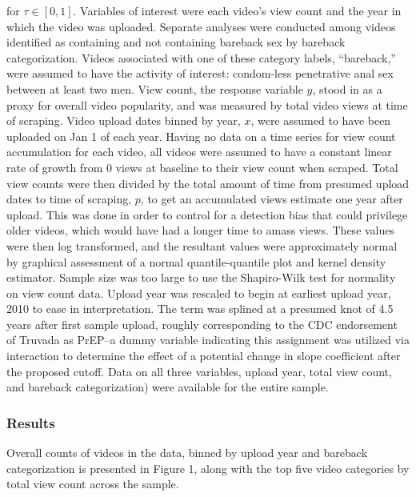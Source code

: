 \documentclass[]{article}
\begin{document}
for \(\tau \in \left [0,1 \right ]\). Variables of interest were each
video's view count and the year in which the video was uploaded.
Separate analyses were conducted among videos identified as containing
and not containing bareback sex by bareback categorization. Videos
associated with one of these category labels, ``bareback,'' were assumed
to have the activity of interest: condom-less penetrative anal sex
between at least two men. View count, the response variable \(y\), stood
in as a proxy for overall video popularity, and was measured by total
video views at time of scraping. Video upload dates binned by year,
\(x\), were assumed to have been uploaded on Jan 1 of each year. Having
no data on a time series for view count accumulation for each video, all
videos were assumed to have a constant linear rate of growth from 0
views at baseline to their view count when scraped. Total view counts
were then divided by the total amount of time from presumed upload dates
to time of scraping, \(p\), to get an accumulated views estimate one
year after upload. This was done in order to control for a detection
bias that could privilege older videos, which would have had a longer
time to amass views. These values were then log transformed, and the
resultant values were approximately normal by graphical assessment of a
normal quantile-quantile plot and kernel density estimator. Sample size
was too large to use the Shapiro-Wilk test for normality on view count
data. Upload year was rescaled to begin at earliest upload year, 2010 to
ease in interpretation. The term was splined at a presumed knot of 4.5
years after first sample upload, roughly corresponding to the CDC
endorsement of Truvada as PrEP--a dummy variable indicating this
assignment was utilized via interaction to determine the effect of a
potential change in slope coefficient after the proposed cutoff. Data on
all three variables, upload year, total view count, and bareback
categorization) were available for the entire sample.

\subsubsection{Results}\label{results}

Overall counts of videos in the data, binned by upload year and bareback
categorization is presented in Figure 1, along with the top five video
categories by total view count across the sample.
\end{document}
